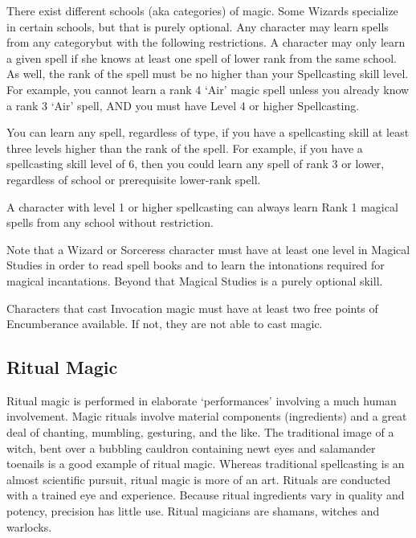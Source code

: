 \documentclass[twoside]{book}
\begin{document}
    {  
      There exist different schools (aka categories) of
               magic. Some Wizards specialize in certain schools, but
               that is purely optional. Any character may learn spells
               from any categorybut with the following
               restrictions. A character may only learn a given spell if
               she knows at least one spell of lower rank from the same
               school. As well, the rank of the spell must be no higher
               than your Spellcasting skill level. For example, you
               cannot learn a rank 4 `Air' magic spell unless
               you already know a rank 3 `Air' spell, AND you
               must have Level 4 or higher Spellcasting. 
    }
  
    {  
      You can learn any spell, regardless of type, if you
               have a spellcasting skill at least three levels higher
               than the rank of the spell. For example, if you have a
               spellcasting skill level of 6, then you could learn any
               spell of rank 3 or lower, regardless of school or
               prerequisite lower-rank spell. 
    }
  
    {  
      A character with level 1 or higher spellcasting can
               always learn Rank 1 magical spells from any school without
               restriction. 
    }
  
    {  
      Note that a Wizard or Sorceress character must have
               at least one level in Magical Studies in order to read
               spell books and to learn the intonations required for
               magical incantations. Beyond that Magical Studies is a
               purely optional skill. 
    }
  
    {  
      Characters that cast Invocation magic must have at
               least two free points of Encumberance available. If not,
               they are not able to cast magic. 
    }
  
    

\subsection{Ritual Magic}
    
    {  
      Ritual magic is performed in elaborate
               `performances' involving a much human
               involvement. Magic rituals involve material components
               (ingredients) and a great deal of chanting, mumbling,
               gesturing, and the like. The traditional image of a witch,
               bent over a bubbling cauldron containing newt eyes and
               salamander toenails is a good example of ritual magic.
               Whereas traditional spellcasting is an almost scientific
               pursuit, ritual magic is more of an art. Rituals are
               conducted with a trained eye and experience. Because
               ritual ingredients vary in quality and potency, precision
               has little use. Ritual magicians are shamans, witches and
               warlocks. 
    }
  
\end{document}
